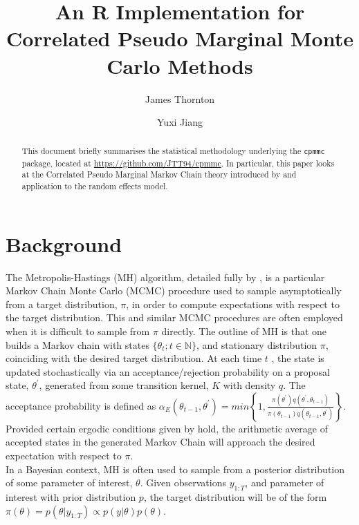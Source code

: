 \documentclass{article}
\title{An R Implementation for Correlated Pseudo Marginal Monte Carlo Methods}
\author{James Thornton \and Yuxi Jiang}
\begin{document}


\maketitle

\begin{abstract}
This document briefly summarises the statistical methodology underlying the \texttt{cpmmc} package, located at \url{https://github.com/JTT94/cpmmc}. In particular, this paper looks at the Correlated Pseudo Marginal Markov Chain theory introduced by \cite{cpmmDeligiannidis2015} and application to the random effects model.
\end{abstract}

\section{Background}

The Metropolis-Hastings (MH) algorithm, detailed fully by \cite{roberts2004}, is a particular Markov Chain Monte Carlo (MCMC) procedure used to sample asymptotically from a target distribution, $\pi$, in order to compute expectations with respect to the target distribution. This and similar MCMC procedures are often employed when it is difficult to sample from $\pi$ directly. The outline of MH is that one builds a Markov chain with states $\{\theta_t ; t \in \mathbb{N}\}$, and stationary distribution $\pi$, coinciding with the desired target distribution. At each time $ t $ , the state is updated stochastically via an acceptance/rejection probability on a proposal state, $\theta^\prime$, generated from some transition kernel, $K$ with density $q$. The acceptance probability is defined as  $ \alpha_E(\theta_{t-1}, \theta^\prime) = min\left\{1,  \frac{
                \pi(\theta^\prime) q(\theta^\prime, \theta_{t-1})}
                {\pi(\theta_{t-1}) q(\theta_{t-1}, \theta^\prime)}
\right\} $. Provided certain ergodic conditions given by \cite{roberts2004} hold, the arithmetic average of accepted states in the generated Markov Chain will approach the desired expectation with respect to $\pi$. \\

In a Bayesian context, MH is often used to sample from a posterior distribution of some parameter of interest, $\theta$. Given observations $y_{1:T}$, and parameter of interest with prior distribution $p$, the target distribution will be of the form $\pi (\theta) = p(\theta | y_{1:T} ) \propto p(y|\theta) p(\theta)$.\\
\end{document}
